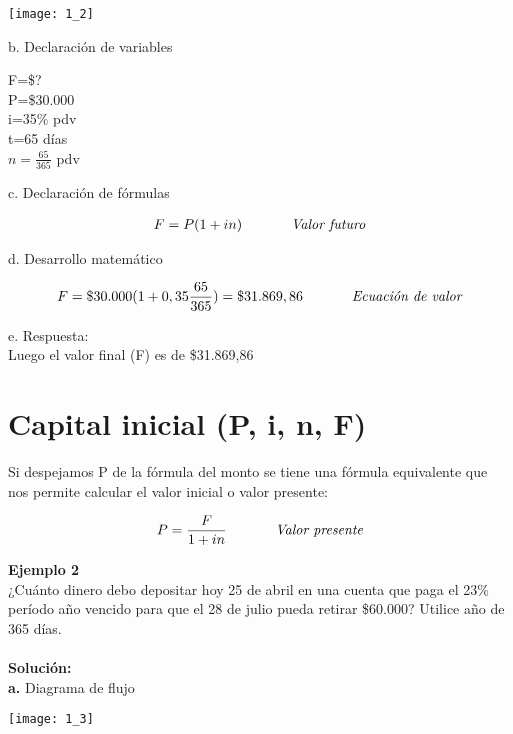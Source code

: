 \begin{center}
\texttt{[image: 1\_2]}
\end{center}

b. Declaración de variables

F=\$? \\ P=\$30.000 \\ i=35\% pdv \\ t=65 días\\ $n=\frac{65}{365}$ pdv

c. Declaración de fórmulas

\begin{align*}
F=P(1+in) \hspace{35 pt} \textit{Valor futuro}
\end{align*}

d. Desarrollo matemático

\begin{align*}
F=\$30.000(1 + 0,35\frac{65}{365})= \$31.869,86 \hspace{35 pt} \textit{Ecuación de valor}
\end{align*} \hspace{35 pt} 

e. Respuesta:
\\
Luego el valor final (F) es de \$31.869,86

\section{Capital inicial (P, i, n, F)}
Si despejamos P de la fórmula del monto se tiene una fórmula equivalente que nos permite calcular el valor inicial o valor presente:

\begin{align*}
	P=\frac{F}{1+in} \hspace{35 pt} \textit{Valor presente}
\end{align*}

\textbf{Ejemplo 2}
\\
¿Cuánto dinero debo depositar hoy 25 de abril en una cuenta que paga el 23\% período año vencido para que el 28 de julio pueda retirar \$60.000? Utilice año de 365 días.
\\\\
\textbf{Solución:}
\\
\textbf{a.}	Diagrama de flujo
\begin{center}
\texttt{[image: 1\_3]}
\end{center}


